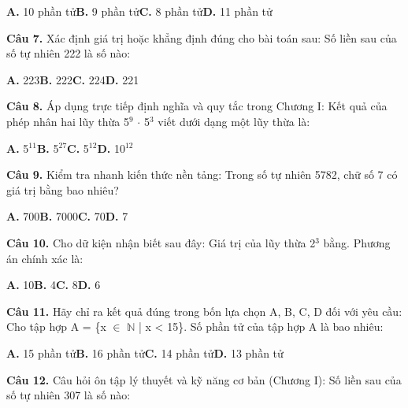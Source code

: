 \documentclass[11pt,a4paper]{article}
\begin{document}
\hspace*{1.5em}\textbf{A.} 10 phần tử\quad\quad \textbf{B.} 9 phần tử\quad\quad \textbf{C.} 8 phần tử\quad\quad \textbf{D.} 11 phần tử\par\vspace{2pt}
\textbf{\color{primary} Câu 7.} Xác định giá trị hoặc khẳng định đúng cho bài toán sau: Số liền sau của số tự nhiên 222 là số nào:\par
\hspace*{1.5em}\textbf{A.} 223\quad\quad \textbf{B.} 222\quad\quad \textbf{C.} 224\quad\quad \textbf{D.} 221\par\vspace{2pt}
\textbf{\color{primary} Câu 8.} Áp dụng trực tiếp định nghĩa và quy tắc trong Chương I: Kết quả của phép nhân hai lũy thừa 5$^{9}$ $\cdot$ 5$^{3}$ viết dưới dạng một lũy thừa là:\par
\hspace*{1.5em}\textbf{A.} 5$^{11}$\quad\quad \textbf{B.} 5$^{27}$\quad\quad \textbf{C.} 5$^{12}$\quad\quad \textbf{D.} 10$^{12}$\par\vspace{2pt}
\textbf{\color{primary} Câu 9.} Kiểm tra nhanh kiến thức nền tảng: Trong số tự nhiên 5782, chữ số 7 có giá trị bằng bao nhiêu?\par
\hspace*{1.5em}\textbf{A.} 700\quad\quad \textbf{B.} 7000\quad\quad \textbf{C.} 70\quad\quad \textbf{D.} 7\par\vspace{2pt}
\textbf{\color{primary} Câu 10.} Cho dữ kiện nhận biết sau đây: Giá trị của lũy thừa 2$^{3}$ bằng. Phương án chính xác là:\par
\hspace*{1.5em}\textbf{A.} 10\quad\quad \textbf{B.} 4\quad\quad \textbf{C.} 8\quad\quad \textbf{D.} 6\par\vspace{2pt}
\textbf{\color{primary} Câu 11.} Hãy chỉ ra kết quả đúng trong bốn lựa chọn A, B, C, D đối với yêu cầu: Cho tập hợp A = \{x $\in$ $\mathbb{N}$ | x < 15\}. Số phần tử của tập hợp A là bao nhiêu:\par
\hspace*{1.5em}\textbf{A.} 15 phần tử\quad\quad \textbf{B.} 16 phần tử\quad\quad \textbf{C.} 14 phần tử\quad\quad \textbf{D.} 13 phần tử\par\vspace{2pt}
\textbf{\color{primary} Câu 12.} Câu hỏi ôn tập lý thuyết và kỹ năng cơ bản (Chương I): Số liền sau của số tự nhiên 307 là số nào:\par
\end{document}
